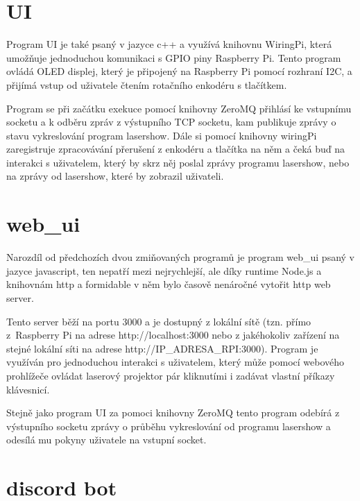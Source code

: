 \section{UI}

Program UI je také psaný v jazyce c++ a využívá knihovnu WiringPi, která umožňuje jednoduchou komunikaci s GPIO piny Raspberry Pi. Tento program ovládá OLED displej, který je připojený na Raspberry Pi pomocí rozhraní I2C, a přijímá vstup od uživatele čtením rotačního enkodéru s tlačítkem.

Program se při začátku exekuce pomocí knihovny ZeroMQ přihlásí ke vstupnímu socketu a k odběru zpráv z výstupního TCP socketu, kam publikuje zprávy o stavu vykreslování program lasershow. Dále si pomocí knihovny wiringPi zaregistruje zpracovávání přerušení z enkodéru a tlačítka na něm a čeká buď na interakci s uživatelem, který by skrz něj poslal zprávy programu lasershow, nebo na zprávy od lasershow, které by zobrazil uživateli.


\section{web\_ui}

Narozdíl od předchozích dvou zmiňovaných programů je program web\_ui psaný v jazyce javascript, ten nepatří mezi nejrychlejší, ale díky runtime Node.js a knihovnám http a formidable v něm bylo časově nenáročné vytořit http web server.

Tento server běží na portu 3000 a je dostupný z lokální sítě (tzn. přímo z\ Raspberry Pi na adrese http://localhost:3000 nebo z jakéhokoliv zařízení na stejné lokální síti na adrese http://IP\_ADRESA\_RPI:3000).
Program je využíván pro jednoduchou interakci s uživatelem, který může pomocí webového prohlížeče ovládat laserový projektor pár kliknutími i zadávat vlastní příkazy klávesnicí.



Stejně jako program UI za pomoci knihovny ZeroMQ tento program odebírá z výstupního socketu zprávy o průběhu vykreslování od programu lasershow a odesílá mu pokyny uživatele na vstupní socket.



\section{discord bot}

